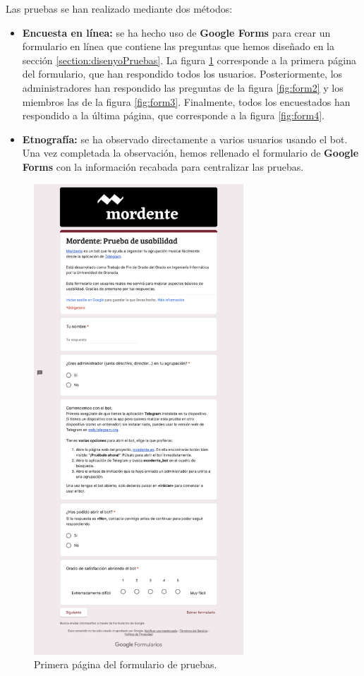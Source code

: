 Las pruebas se han realizado mediante dos métodos:

\begin{itemize}
    \item \textbf{Encuesta en línea:} se ha hecho uso de \textbf{Google Forms} para crear un formulario en línea que contiene las preguntas que hemos diseñado en la sección \ref{section:disenyoPruebas}. La figura \ref{fig:form1} corresponde a la primera página del formulario, que han respondido todos los usuarios. Posteriormente, los administradores han respondido las preguntas de la figura \ref{fig:form2} y los miembros las de la figura \ref{fig:form3}. Finalmente, todos los encuestados han respondido a la última página, que corresponde a la figura \ref{fig:form4}.
    \item \textbf{Etnografía:} se ha observado directamente a varios usuarios usando el bot. Una vez completada la observación, hemos rellenado el formulario de \textbf{Google Forms} con la información recabada para centralizar las pruebas.
\end{itemize}

\begin{figure}[h]
\centering
\includegraphics[width=0.7\textwidth]{imagenes/pruebas/form_1.png}
\caption{Primera página del formulario de pruebas.}
\label{fig:form1}
\end{figure}

